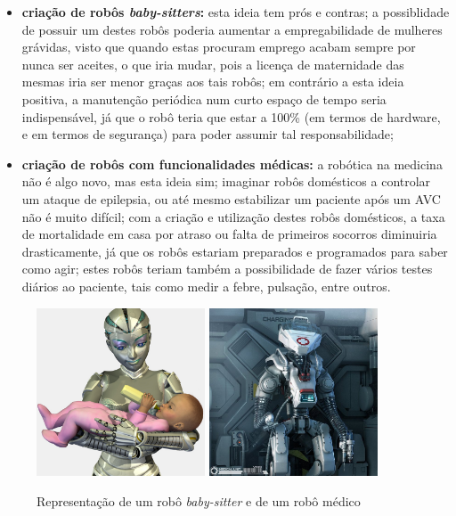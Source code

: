 \documentclass[10pt]{article}
\begin{document}
\begin{itemize}
    \item \textbf{criação de robôs \textit{baby-sitters}:} esta ideia tem prós e contras; a possiblidade de possuir um destes robôs poderia aumentar a empregabilidade de mulheres grávidas, visto que quando estas procuram emprego acabam sempre por nunca ser aceites, o que iria mudar, pois a licença de maternidade das mesmas iria ser menor graças aos tais robôs; em contrário a esta ideia positiva, a manutenção periódica num curto espaço de tempo seria indispensável, já que o robô teria que estar a 100\% (em termos de hardware, e em termos de segurança) para poder assumir tal responsabilidade; 
    \item \textbf{criação de robôs com funcionalidades médicas:} a robótica na medicina não é algo novo, mas esta ideia sim; imaginar robôs domésticos a controlar um ataque de epilepsia, ou até mesmo estabilizar um paciente após um AVC não é muito difícil; com a criação e utilização destes robôs domésticos, a taxa de mortalidade em casa por atraso ou falta de primeiros socorros diminuiria drasticamente, já que os robôs estariam preparados e programados para saber como agir; estes robôs teriam também a possibilidade de fazer vários testes diários ao paciente, tais como medir a febre, pulsação, entre outros.
\end{itemize}

\begin{figure}[h]
\caption{Representação de um robô \textit{baby-sitter} e de um robô médico}
\centering
\includegraphics[width = 5cm]{img/9.2.jpg}
\includegraphics[width = 5cm]{img/9.jpg}
\label{figura:9}
\end{figure}
\end{document}
